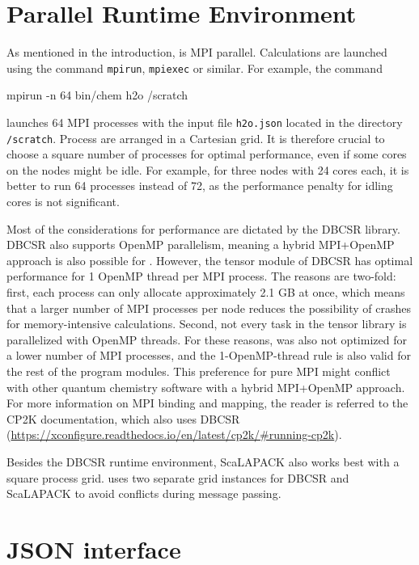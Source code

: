 \section{Parallel Runtime Environment}

As mentioned in the introduction, \mchem{} is MPI parallel. Calculations are launched using the command \texttt{mpirun}, \texttt{mpiexec} or similar. For example, the command
\begin{code}
mpirun -n 64 bin/chem h2o /scratch
\end{code}
\noindent launches 64 MPI processes with the input file \texttt{h2o.json} located in the directory \texttt{/scratch}. Process are arranged in a Cartesian grid. It is therefore crucial to choose a square number of processes for optimal performance, even if some cores on the nodes might be idle. For example, for three nodes with 24 cores each, it is better to run 64 processes instead of 72, as the performance penalty for idling cores is not significant. 

Most of the considerations for performance are dictated by the DBCSR library. DBCSR also supports OpenMP parallelism, meaning a hybrid MPI+OpenMP approach is also possible for \mchem{}. However, the tensor module of DBCSR has optimal performance for 1 OpenMP thread per MPI process. The reasons are two-fold: first, each process can only allocate approximately 2.1 GB at once, which means that a larger number of MPI processes per node reduces the possibility of crashes for memory-intensive calculations. Second, not every task in the tensor library is parallelized with OpenMP threads. For these reasons, \mchem{} was also not optimized for a lower number of MPI processes, and the 1-OpenMP-thread rule is also valid for the rest of the program modules. This preference for pure MPI might conflict with other quantum chemistry software with a hybrid MPI+OpenMP approach. For more information on MPI binding and mapping, the reader is referred to the CP2K documentation, which also uses DBCSR (\url{https://xconfigure.readthedocs.io/en/latest/cp2k/#running-cp2k}).

Besides the DBCSR runtime environment, ScaLAPACK also works best with a square process grid. \mchem{} uses two separate grid instances for DBCSR and ScaLAPACK to avoid conflicts during message passing.

\section{JSON interface \label{sec:JSON}}


